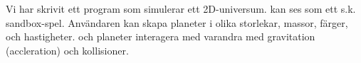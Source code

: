 Vi har skrivit ett program som simulerar ett 2D-universum.
kan ses som ett s.k. sandbox-spel.
Användaren kan skapa planeter i olika
storlekar, massor, färger, och hastigheter.
och planeter interagera med varandra med gravitation (accleration)
och kollisioner.

